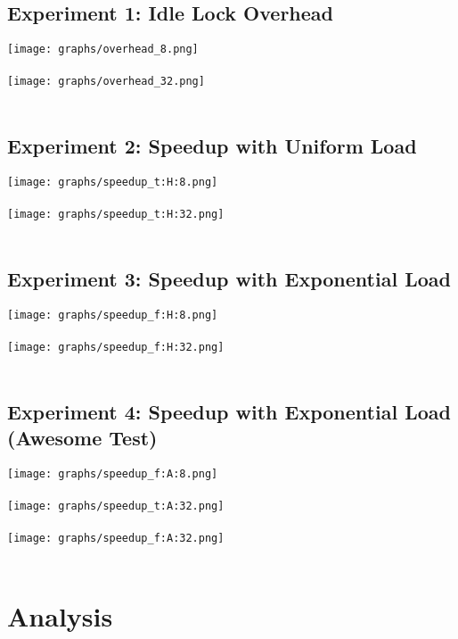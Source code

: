 \documentclass[]{article}
\begin{document}
\subsection{Experiment 1: Idle Lock Overhead}
\texttt{[image: graphs/overhead\_8.png]}\\\\
\texttt{[image: graphs/overhead\_32.png]}\\\\
\subsection{Experiment 2: Speedup with Uniform Load}
\texttt{[image: graphs/speedup\_t:H:8.png]}\\\\
\texttt{[image: graphs/speedup\_t:H:32.png]}\\\\
\subsection{Experiment 3: Speedup with Exponential Load}
\texttt{[image: graphs/speedup\_f:H:8.png]}\\\\
\texttt{[image: graphs/speedup\_f:H:32.png]}\\\\
\subsection{Experiment 4: Speedup with Exponential Load (Awesome Test)}
\texttt{[image: graphs/speedup\_f:A:8.png]}\\\\
\texttt{[image: graphs/speedup\_t:A:32.png]}\\\\
\texttt{[image: graphs/speedup\_f:A:32.png]}\\\\

\section{Analysis}
\end{document}
